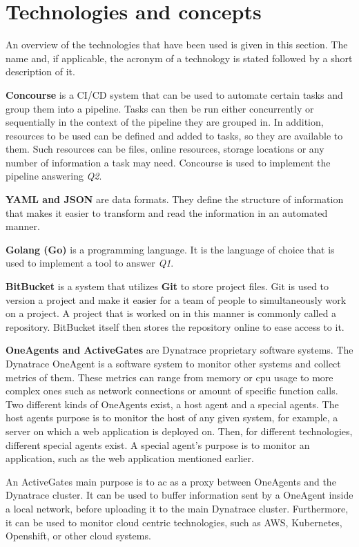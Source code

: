 \chapter{Technologies and concepts}\label{ch:technologies-used}

An overview of the technologies that have been used is given in this section.
The name and, if applicable, the acronym of a technology is stated followed by a short description of it.

\textbf{Concourse} is a CI/CD system that can be used to automate certain tasks and group them into a pipeline.
Tasks can then be run either concurrently or sequentially in the context of the pipeline they are grouped in.
In addition, resources to be used can be defined and added to tasks, so they are available to them.
Such resources can be files, online resources, storage locations or any number of information a task may need.
Concourse is used to implement the pipeline answering \textit{Q2}.

\textbf{YAML and JSON} are data formats.
They define the structure of information that makes it easier to transform and read the information in an automated manner.

\textbf{Golang (Go)} is a programming language.
It is the language of choice that is used to implement a tool to answer \textit{Q1}.

\textbf{BitBucket} is a system that utilizes \textbf{Git} to store project files.
Git is used to version a project and make it easier for a team of people to simultaneously work on a project.
A project that is worked on in this manner is commonly called a repository.
BitBucket itself then stores the repository online to ease access to it.

\textbf{OneAgents and ActiveGates} are Dynatrace proprietary software systems.
The Dynatrace OneAgent\cite{oneagents} is a software system to monitor other systems and collect metrics of them.
These metrics can range from memory or cpu usage to more complex ones such as network connections or amount of specific function calls.
Two different kinds of OneAgents exist, a host agent and a special agents.
The host agents purpose is to monitor the host of any given system, for example, a server on which a web application is deployed on.
Then, for different technologies, different special agents exist.
A special agent's purpose is to monitor an application, such as the web application mentioned earlier.

An ActiveGates\cite{activegates} main purpose is to ac as a proxy between OneAgents and the Dynatrace cluster.
It can be used to buffer information sent by a OneAgent inside a local network, before uploading it to the main Dynatrace cluster.
Furthermore, it can be used to monitor cloud centric technologies, such as AWS, Kubernetes, Openshift, or other cloud systems.

